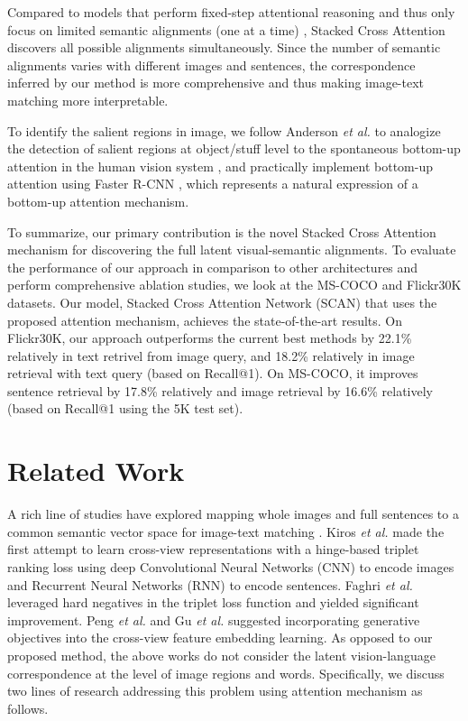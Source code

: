 \documentclass[runningheads]{llncs}
\begin{document}
Compared to models that perform fixed-step attentional reasoning and thus only focus on limited semantic alignments (one at a time) \cite{nam2016dual,huang2017instance}, Stacked Cross Attention discovers all possible alignments simultaneously. Since the number of semantic alignments varies with different images and sentences, the correspondence inferred by our method is more comprehensive and thus making image-text matching more interpretable. 

To identify the salient regions in image, we follow Anderson \textit{et al.} \cite{anderson2017bottom} to analogize the detection of salient regions at object/stuff level to the spontaneous bottom-up attention in the human vision system \cite{buschman2007top,corbetta2002control,katsuki2014bottom}, and practically implement bottom-up attention using Faster R-CNN \cite{ren2015faster}, which represents a natural expression of a bottom-up attention mechanism. 

To summarize, our primary contribution is the novel Stacked Cross Attention mechanism for discovering the full latent visual-semantic alignments. To evaluate the performance of our approach in comparison to other architectures and perform comprehensive ablation studies, we look at the MS-COCO \cite{lin2014microsoft} and Flickr30K \cite{young2014image} datasets. Our model, Stacked Cross Attention Network (SCAN) that uses the proposed attention mechanism, achieves the state-of-the-art results. On Flickr30K, our approach outperforms the current best methods by 22.1\% relatively in text retrivel from image query, and 18.2\% relatively in image retrieval with text query (based on Recall@1). On MS-COCO, it improves sentence retrieval by 17.8\% relatively and image retrieval by 16.6\% relatively (based on Recall@1 using the 5K test set). 

\section{Related Work}

A rich line of studies have explored mapping whole images and full sentences to a common semantic vector space for image-text matching \cite{kiros2014unifying,vendrov2015order,ba2016layer,wang2016learning,klein2015associating,lev2016rnn,zheng2017dual,faghri2017vse++,peng2017cm,gu2017look,eisenschtat2017linking,devlin2015language,fang2015captions}. Kiros \textit{et al.} \cite{kiros2014unifying} made the first attempt to learn cross-view representations with a hinge-based triplet ranking loss using deep Convolutional Neural Networks (CNN) to encode images and Recurrent Neural Networks (RNN) to encode sentences. Faghri \textit{et al.} \cite{faghri2017vse++} leveraged hard negatives in the triplet loss function and yielded significant improvement. Peng \textit{et al.} \cite{peng2017cm} and Gu \textit{et al.} \cite{gu2017look} suggested incorporating generative objectives into the cross-view feature embedding learning. As opposed to our proposed method, the above works do not consider the latent vision-language correspondence at the level of image regions and words. Specifically, we discuss two lines of research addressing this problem using attention mechanism as follows.
\end{document}
